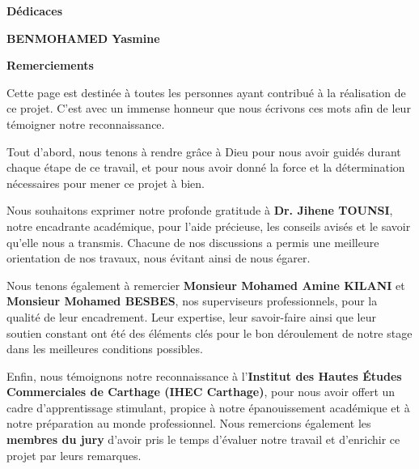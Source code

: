 \begin{center}
\textbf{\LARGE Dédicaces}
\end{center}

\vspace{1cm}

\vfill
\begin{flushright}
\textbf{BENMOHAMED Yasmine}
\end{flushright}

\clearpage
\thispagestyle{empty}

\vspace*{5cm}

\begin{center}
\textbf{\LARGE Remerciements}
\end{center}

\vspace{1cm}

Cette page est destinée à toutes les personnes ayant contribué à la réalisation de ce projet. C’est avec un immense honneur que nous écrivons ces mots afin de leur témoigner notre reconnaissance.

Tout d’abord, nous tenons à rendre grâce à Dieu pour nous avoir guidés durant chaque étape de ce travail, et pour nous avoir donné la force et la détermination nécessaires pour mener ce projet à bien.

Nous souhaitons exprimer notre profonde gratitude à \textbf{Dr. Jihene TOUNSI}, notre encadrante académique, pour l’aide précieuse, les conseils avisés et le savoir qu’elle nous a transmis. Chacune de nos discussions a permis une meilleure orientation de nos travaux, nous évitant ainsi de nous égarer.

Nous tenons également à remercier \textbf{Monsieur Mohamed Amine KILANI} et \textbf{Monsieur Mohamed BESBES}, nos superviseurs professionnels, pour la qualité de leur encadrement. Leur expertise, leur savoir-faire ainsi que leur soutien constant ont été des éléments clés pour le bon déroulement de notre stage dans les meilleures conditions possibles.

Enfin, nous témoignons notre reconnaissance à l’\textbf{Institut des Hautes Études Commerciales de Carthage (IHEC Carthage)}, pour nous avoir offert un cadre d’apprentissage stimulant, propice à notre épanouissement académique et à notre préparation au monde professionnel. Nous remercions également les \textbf{membres du jury} d’avoir pris le temps d'évaluer notre travail et d'enrichir ce projet par leurs remarques.
\vfill